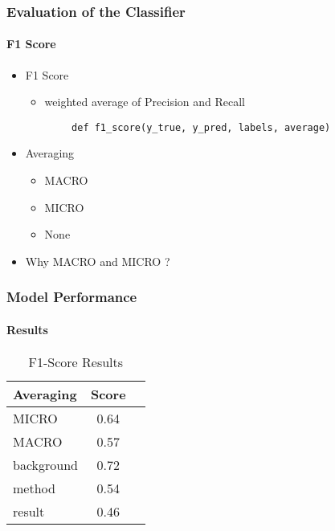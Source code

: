 \documentclass[
  xcolor={svgnames},
  hyperref={colorlinks,citecolor=DeepPink4,linkcolor=DarkRed,urlcolor=DarkBlue}
  ]{beamer}
\begin{document}
\begin{frame}[fragile]
\frametitle{Evaluation of the Classifier}
\framesubtitle{F1 Score}

\bigskip

\begin{itemize}
	\item F1 Score
		\begin{itemize}
			\item weighted average of Precision and Recall
		\end{itemize}
		\bigskip
		\begin{verbatim}
		def f1_score(y_true, y_pred, labels, average)
		\end{verbatim}
		\bigskip
	\item Averaging
		\begin{itemize}
			\item MACRO
			\item MICRO
			\item None
		\end{itemize}
	\bigskip
	\item Why {\color{red} MACRO} and {\color{red}MICRO} ?
	
\end{itemize}

\end{frame}

\begin{frame}
\frametitle{Model Performance}
\framesubtitle{Results}

\begin{table}
\def\arraystretch{1.5}
	{\setlength{\tabcolsep}{2em}
	\begin{tabular}{| l | c | c |} \hline
		 {\bf Averaging} & {\bf Score} \\
		 \hline \hline
		 MICRO & 0.64 \\
		  \hline
		 MACRO & 0.57 \\
		  \hline
		 background & 0.72 \\
		 method & 0.54 \\
		 result & 0.46 \\
		  \hline
	 \end{tabular}}

\caption{F1-Score Results}
\end{table}

\end{frame}
\end{document}
